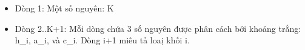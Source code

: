 \begin{itemize}
	\item Dòng 1: Một số nguyên: K
	\item Dòng 2..K+1: Mỗi dòng chứa 3 số nguyên được phân cách bởi khoảng trắng: h\_i, a\_i, và c\_i. Dòng i+1 miêu tả loaị khối i.
\end{itemize}